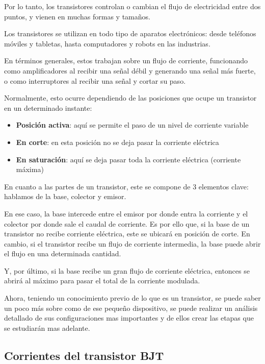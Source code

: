 Por lo tanto, los transistores controlan o cambian el flujo de electricidad entre dos puntos, y vienen en muchas formas y tamaños.

Los transistores se utilizan en todo tipo de aparatos electrónicos: desde teléfonos móviles y tabletas, hasta computadores y robots en las industrias.

En términos generales, estos trabajan sobre un flujo de corriente, funcionando como amplificadores al recibir una señal débil y generando una señal más fuerte, o como interruptores al recibir una señal y cortar su paso.

Normalmente, esto ocurre dependiendo de las posiciones que ocupe un transistor en un determinado instante:
\begin{itemize}
    \item \textbf{Posición activa}: aquí se permite el paso de un nivel de corriente variable
    \item \textbf{En corte}: en esta posición no se deja pasar la corriente eléctrica
    \item \textbf{En saturación}: aquí se deja pasar toda la corriente eléctrica (corriente máxima)
\end{itemize}



En cuanto a las partes de un transistor, este se compone de 3 elementos clave: hablamos de la base, colector y emisor.

En ese caso, la base intercede entre el emisor por donde entra la corriente y el colector por donde sale el caudal de corriente.  Es por ello que, si la base de un transistor no recibe corriente eléctrica, este se ubicará en posición de corte. En cambio, si el transistor recibe un flujo de corriente intermedia, la base puede abrir el flujo en una determinada cantidad.

Y, por último, si la base recibe un gran flujo de corriente eléctrica, entonces se abrirá al máximo para pasar el total de la corriente modulada.

Ahora, teniendo un conocimiento previo de lo que es un transistor, se puede saber un poco más sobre como de ese pequeño dispositivo, se puede realizar un análisis detallado de sus configuraciones mas importantes y de ellos crear las etapas que se estudiarán mas adelante.

\subsection{Corrientes del transistor BJT}

